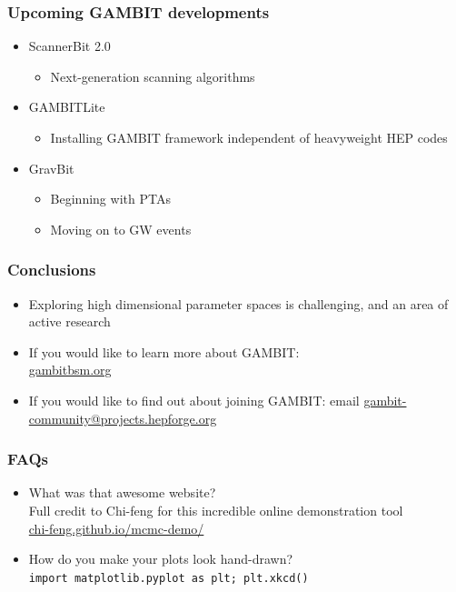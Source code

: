 \documentclass[aspectratio=169]{beamer}
\begin{document}
\begin{frame}
    \frametitle{Upcoming GAMBIT developments}
    \begin{itemize}
        \item ScannerBit 2.0
            \begin{itemize}
                \item Next-generation scanning algorithms
            \end{itemize}
        \item GAMBITLite
            \begin{itemize}
                \item Installing GAMBIT framework independent of heavyweight HEP codes
            \end{itemize}
        \item GravBit
            \begin{itemize}
                \item Beginning with PTAs
                \item Moving on to GW events
            \end{itemize}
    \end{itemize}
\end{frame}


\begin{frame}
    \frametitle{Conclusions}
    \begin{itemize}
        \item Exploring high dimensional parameter spaces is challenging, and an area of active research
        \item If you would like to learn more about GAMBIT:\\
            \href{https://gambitbsm.org/}{gambitbsm.org}
        \item If you would like to find out about joining GAMBIT:
            email \href{mailto:gambit-community@projects.hepforge.org}{gambit-community@projects.hepforge.org}
    \end{itemize}
\end{frame}

\appendix
\begin{frame}
    \frametitle{FAQs}
    
    \begin{itemize}
    \item What was that awesome website? \\
    \hfill Full credit to Chi-feng for this incredible online demonstration tool\\
    \hfill \href{https://chi-feng.github.io/mcmc-demo/}{chi-feng.github.io/mcmc-demo/}

    \item How do you make your plots look hand-drawn? \\
        \hfill \texttt{import matplotlib.pyplot as plt; plt.xkcd()}
    \end{itemize}
\end{frame}
\end{document}
